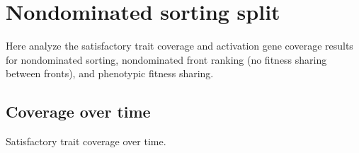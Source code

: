 \documentclass[]{book}
\begin{document}
\hypertarget{nondominated-sorting-split}{%
\section{Nondominated sorting split}\label{nondominated-sorting-split}}

Here analyze the satisfactory trait coverage and activation gene coverage results for nondominated sorting, nondominated front ranking (no fitness sharing between fronts), and phenotypic fitness sharing.

\hypertarget{coverage-over-time-1}{%
\subsection{Coverage over time}\label{coverage-over-time-1}}

Satisfactory trait coverage over time.
\end{document}
